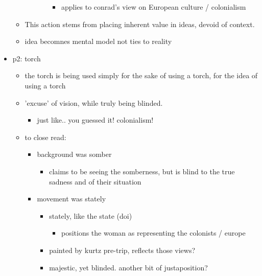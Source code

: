 \documentclass[letterpaper]{article}
\begin{document}
\begin{itemize}
\begin{itemize}
\begin{itemize}
\begin{itemize}
\begin{itemize}
\item applies to conrad's view on European culture / colonialism
\end{itemize}
\end{itemize}
\end{itemize}

\item This action stems from placing inherent value in ideas, devoid of
context.
\item idea becomnes mental model not ties to reality
\end{itemize}

\item p2: torch

\begin{itemize}
\item the torch is being used simply for the sake of using a torch, for
the idea of using a torch
\item 'excuse' of vision, while truly being blinded.

\begin{itemize}
\item just like.. you guessed it! colonialism!
\end{itemize}

\item to close read:

\begin{itemize}
\item background was somber

\begin{itemize}
\item claims to be seeing the somberness, but is blind to the true
sadness and of their situation
\end{itemize}

\item movement was stately

\begin{itemize}
\item stately, like the state (doi)

\begin{itemize}
\item positions the woman as representing the colonists / europe
\end{itemize}

\item painted by kurtz pre-trip, reflects those views?
\item majestic, yet blinded. another bit of justaposition?
\end{itemize}


\end{itemize}
\end{itemize}
\end{itemize}
\end{document}
